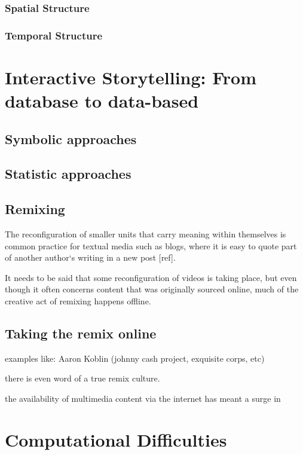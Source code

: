 \subsubsection{Spatial Structure}
\subsubsection{Temporal Structure}




\section{Interactive Storytelling: From database to data-based}
\label{ch:storytelling}
\subsection{Symbolic approaches}
\label{sec:symbolic}

\cite{Vilmos:2011wv,RodrigoLaiolaGuimaraes:2011tl,Ursu:2009gc}

\subsection{Statistic approaches}
\label{sec:statistic}

\subsection{Remixing}

The reconfiguration of smaller units that carry meaning within themselves is common practice for textual media such as blogs, where it is easy to quote part of  another author`s writing in a new post [ref]. 

It needs to be said that some reconfiguration of videos is taking place, but even though it often concerns content that was originally sourced online, much of the creative act of remixing happens offline.


\subsection{Taking the remix online}

examples like: Aaron Koblin (johnny cash project, exquisite corps, etc)

there is even word of a true remix culture.

the availability of multimedia content via the internet has meant a surge in 


\section{Computational Difficulties}







